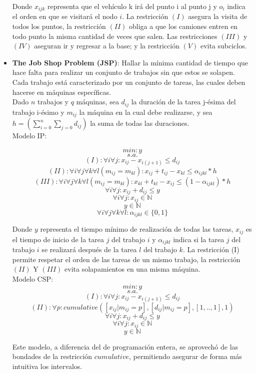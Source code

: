 \documentclass[12pt]{report}
\begin{document}
\begin{itemize}
Donde $x_{ijk}$ representa que el vehículo k irá del punto i al punto j y $o_i$ indica el orden en que se visitará el nodo $i$. La restricción $(I)$ asegura la visita de todos los puntos, la restricción $(II)$ obliga a que los camiones entren en todo punto la misma cantidad de veces que salen. Las restricciones $(III)$ y $(IV)$ aseguran ir y regresar a la base; y la restricción $(V)$ evita subciclos.


\item \textbf{The Job Shop Problem (JSP)}: Hallar la mínima cantidad de tiempo que hace falta para realizar un conjunto de trabajos sin que estos se solapen. Cada trabajo está caracterizado por un conjunto de tareas, las cuales deben hacerse en máquinas específicas.\\

Dado $n$ trabajos y $q$ máquinas, sea $d_{ij}$ la duración de la tarea j-ésima del trabajo i-ésimo y $m_{ij}$ la máquina en la cual debe realizarse, y sea $h=(\sum_{i=0}^n\sum_{j=0}d_{ij})$ la suma de todas las duraciones.\\

Modelo IP:

$$min: y$$
$$s.a.$$
$$(I):\forall i \forall j: x_{ij}-x_{i(j+1)} \leq d_{ij}$$
$$(II):\forall i \forall j \forall k \forall l(m_{ij}=m_{kl}): x_{ij}+t_{ij}-x_{kl} \leq \alpha_{ijkl}*h$$
$$(III):\forall i \forall j \forall k \forall l(m_{ij}=m_{kl}): x_{kl}+t_{kl}-x_{ij} \leq (1-\alpha_{ijkl})*h$$
$$\forall i\forall j:x_{ij}+d_{ij}\leq y$$
$$\forall i\forall j: x_{ij}\in\mathbb{N}$$
$$y\in\mathbb{N}$$
$$\forall i\forall j\forall k\forall l:\alpha_{ijkl}\in\{0,1\}$$

Donde $y$ representa el tiempo mínimo de realización de todas las tareas, $x_{ij}$ es el tiempo de inicio de la tarea $j$ del trabajo $i$ y $\alpha_{ijkl}$ indica si la tarea $j$ del trabajo $i$ se realizará después de la tarea $l$ del trabajo $k$. La restricción (I) permite respetar el orden de las tareas de un mismo trabajo, la restricción $(II)$ Y $(III)$ evita solapamientos en una misma máquina.\\

Modelo CSP:
$$min: y$$
$$s.a.$$
$$(I):\forall i \forall j: x_{ij}-x_{i(j+1)} \leq d_{ij}$$
$$(II): \forall p: cumulative([x_{ij}|m_{ij}=p],[d_{ij}|m_{ij}=p],[1,..,1],1)$$
$$\forall i\forall j:x_{ij}+d_{ij}\leq y$$
$$\forall i\forall j: x_{ij}\in\mathbb{N}$$
$$y\in\mathbb{N}$$

Este modelo, a diferencia del de programación entera, se aprovechó de las bondades de la restricción $cumulative$, permitiendo asegurar de forma más intuitiva los intervalos.


\end{itemize}
\end{document}
